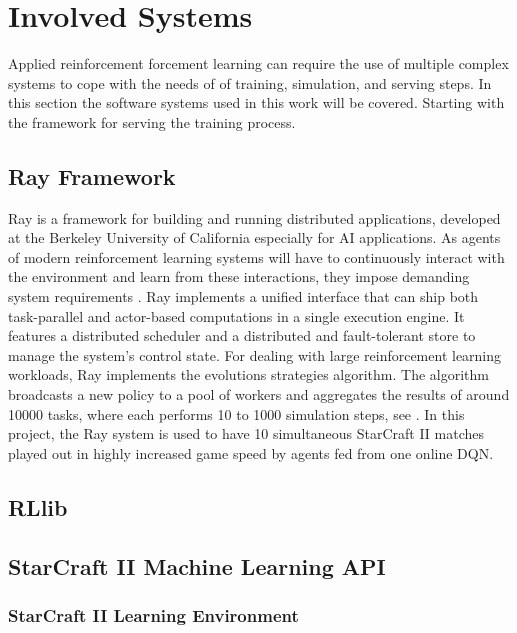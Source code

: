 \documentclass[12pt,a4paper]{article}
\begin{document}
\section{Involved Systems}
Applied reinforcement forcement learning can require the use of multiple complex systems to cope with the needs of of training, simulation, and serving steps. In this section the software systems used in this work will be covered. Starting with the framework for serving the training process.
\subsection{Ray Framework}
Ray is a framework for building and running distributed applications, developed at the Berkeley University of California especially for AI applications. As agents of modern reinforcement learning systems will have to continuously interact with the environment and learn from these interactions, they impose demanding system requirements \cite{Moritz2017}. Ray implements a unified interface that can ship both task-parallel and actor-based computations in a single execution engine.
It features a distributed scheduler and a distributed and fault-tolerant store to manage the system's control state.
For dealing with large reinforcement learning workloads, Ray implements the evolutions strategies algorithm. The algorithm broadcasts a new policy to a pool of workers and aggregates the results of around 10000 tasks, where each performs 10 to 1000 simulation steps, see \cite{Moritz2017}.
In this project, the Ray system is used to have 10 simultaneous StarCraft II matches played out in highly increased game speed by agents fed from one online DQN.
\subsection{RLlib}
\subsection{StarCraft II Machine Learning API}
\label{sec:SC2API}
\subsubsection{StarCraft II Learning Environment}
\end{document}

